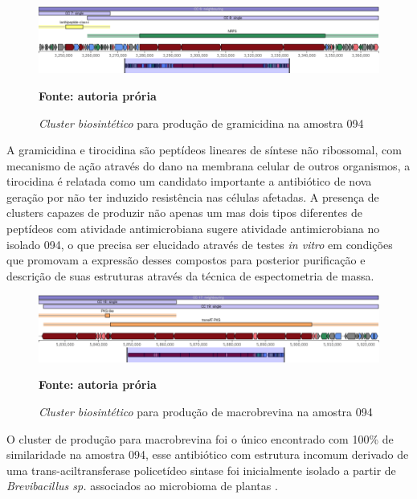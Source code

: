 \begin{figure}[H]
	\caption{\textit{Cluster biosintético} para produção de gramicidina na amostra 094}
	\label{fig:quast_16}
	\centering
		\includegraphics[width=0.8\linewidth]{imagens/antismash/094regiao3.png} \\
	\centering
    \begin{small}\textbf{Fonte: autoria prória}\end{small}
\end{figure}
\vspace{\floatsep}

A gramicidina e tirocidina são peptídeos lineares de síntese não ribossomal, com mecanismo de ação
através do dano na membrana celular de outros organismos, a tirocidina é relatada como um candidato importante
a antibiótico de nova geração por não ter induzido resistência nas células afetadas\cite{yang2018antimicrobial}.
A presença de clusters capazes de produzir não apenas um mas dois tipos diferentes de peptídeos com
atividade antimicrobiana sugere atividade antimicrobiana no isolado 094, o que precisa ser elucidado através
de testes \textit{in vitro} em condições que promovam a expressão desses compostos para posterior purificação e
descrição de suas estruturas através da técnica de espectometria de massa.

\begin{figure}[H]
	\caption{\textit{Cluster biosintético} para produção de macrobrevina na amostra 094}
	\label{fig:quast_16}
	\centering
		\includegraphics[width=0.8\linewidth]{imagens/antismash/094regiao4.png} \\
	\centering
    \begin{small}\textbf{Fonte: autoria prória}\end{small}
\end{figure}
\vspace{\floatsep}

O cluster de produção para macrobrevina foi o único encontrado com 100\% de similaridade na amostra
094, esse antibiótico com estrutura incomum derivado de uma trans-aciltransferase policetídeo sintase foi inicialmente isolado
a partir de \textit{Brevibacillus sp.} associados ao microbioma de plantas \cite{helfrich2018bipartite}.

